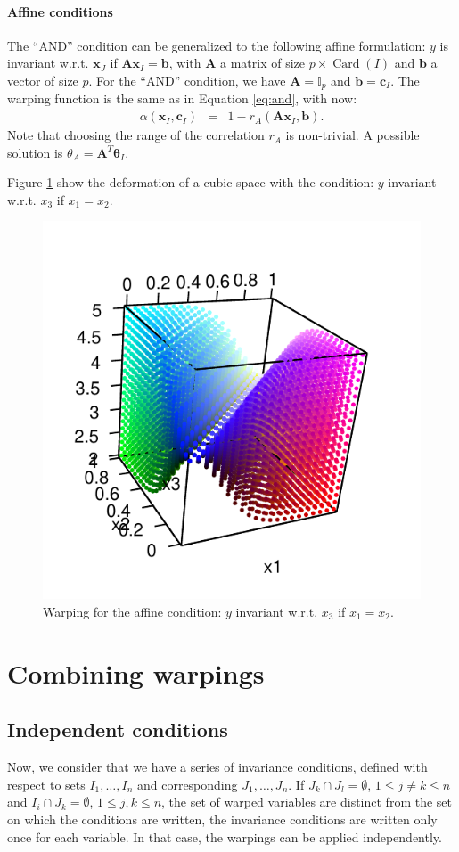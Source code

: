 \documentclass[a4paper,10pt]{article}
\newcommand{\x}{\mathbf{x}}
\newcommand{\cc}{\mathbf{c}}
\def\card{\operatorname{Card}}
\begin{document}
\paragraph{Affine conditions}
The ``AND'' condition can be generalized to the following affine formulation: 
$y$ is invariant w.r.t. $\x_J$ if $\mathbf{A} \x_I = \mathbf{b}$, 
with $\mathbf{A}$ a matrix of size $p \times \card(I)$ and $\mathbf{b}$ a vector of size $p$.
For the ``AND'' condition, we have $\mathbf{A} = \mathbb{I}_p$ and $\mathbf{b}=\cc_I$.
The warping function is the same as in Equation \ref{eq:and}, with now:
\begin{eqnarray}
  \alpha(\x_I,  \cc_I) &=& 1 - r_A(\mathbf{A} \x_I, \mathbf{b}).\label{eq:aff}
\end{eqnarray}
Note that choosing the range of the correlation $r_A$ is non-trivial. A possible solution is $\theta_A = \mathbf{A}^T \boldsymbol{\theta}_I$.

Figure \ref{fig:def3Daff} show the deformation of a cubic space with the condition: $y$ invariant w.r.t. $x_3$ if $x_1 = x_2$. 
 \begin{figure}[!ht]
 \centering
 \includegraphics[width=.4\textwidth]{def3Daff.pdf}
 \caption{Warping for the affine condition: $y$ invariant w.r.t. $x_3$ if $x_1 = x_2$.}\label{fig:def3Daff}
\end{figure}

\section{Combining warpings}
\subsection{Independent conditions}
Now, we consider that we have a series of invariance conditions, defined with respect to sets $I_1, \ldots, I_n$ and corresponding $J_1, \ldots, J_n$.
If $J_k\cap J_l=\emptyset$, $1 \leq j\neq k \leq n$ and $I_i\cap J_k = \emptyset$,  $1 \leq j,k \leq n$,
the set of warped variables are distinct from the set on which the conditions are written, 
the invariance conditions are written only once for each variable. In that case, 
the warpings can be applied independently.
\end{document}
